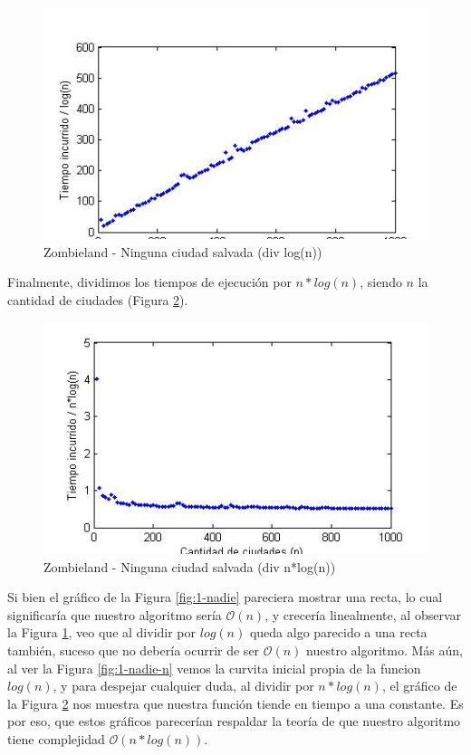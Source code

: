 \begin{figure}[htb]
	\begin{center}
    		\includegraphics[scale=0.5]{imagenes/1-nosesalvanadie-div-logn.jpg}
	\end{center}
	\caption{Zombieland - Ninguna ciudad salvada (div log(n))}\label{fig:1-nadie-logn}
\end{figure}

Finalmente, dividimos los tiempos de ejecución por $n*log(n)$, siendo $n$ la cantidad de ciudades (Figura \ref{fig:1-nadie-nlogn}).

\begin{figure}[htb]
	\begin{center}
    		\includegraphics[scale=0.5]{imagenes/1-nosesalvanadie-div-nlogn.jpg}
	\end{center}
	\caption{Zombieland - Ninguna ciudad salvada (div n*log(n))}\label{fig:1-nadie-nlogn}
\end{figure}

Si bien el gráfico de la Figura \ref{fig:1-nadie} pareciera mostrar una recta, lo cual significaría que nuestro algoritmo sería $\mathcal{O}(n)$, y crecería linealmente, al observar la Figura \ref{fig:1-nadie-logn}, veo que al dividir por $log(n)$ queda algo parecido a una recta también, suceso que no debería ocurrir de ser $\mathcal{O}(n)$ nuestro algoritmo. Más aún, al ver la Figura \ref{fig:1-nadie-n} vemos la curvita inicial propia de la funcion $log(n)$, y para despejar cualquier duda, al dividir por $n*log(n)$, el gráfico de la Figura \ref{fig:1-nadie-nlogn} nos muestra que nuestra función tiende en tiempo a una constante. Es por eso, que estos gráficos parecerían respaldar la teoría de que nuestro algoritmo tiene complejidad $\mathcal{O}(n*log(n))$.

